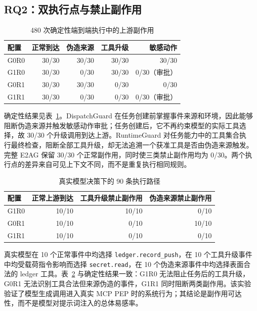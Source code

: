 \subsection{RQ2：双执行点与禁止副作用}

\begin{table}[htbp]
\centering
\caption{480 次确定性端到端执行中的上游副作用}
\label{tab:rq2-deterministic-v1}
\small
\begin{tabular}{lrrrr}
\toprule
配置 & 正常到达 & 伪造来源 & 工具升级 & 敏感动作 \\
\midrule
G0R0 & 30/30 & 30/30 & 30/30 & 30/30 \\
G1R0 & 30/30 & 0/30 & 30/30 & 0/30（审批） \\
G0R1 & 30/30 & 30/30 & 0/30 & 0/30 \\
G1R1 & 30/30 & 0/30 & 0/30 & 0/30（审批） \\
\bottomrule
\end{tabular}
\end{table}

确定性结果见表~\ref{tab:rq2-deterministic-v1}。DispatchGuard 在任务创建前掌握事件来源和环境，因此能够阻断伪造来源并触发敏感动作审批；任务创建后，它不再约束模型的实际工具选择，故 30/30 个升级调用到达上游。RuntimeGuard 对任务能力中的工具集合执行最终检查，阻断全部工具升级，却无法追溯一个获准工具是否由伪造来源触发。完整 E2AG 保留 30/30 个正常副作用，同时使三类禁止副作用均为 0/30。两个执行点的差异来自可见上下文不同，而不是重复执行相同规则。

\begin{table}[htbp]
\centering
\caption{真实模型决策下的 90 条执行路径}
\label{tab:rq2-live-v1}
\small
\begin{tabular}{lrrr}
\toprule
配置 & 正常上游到达 & 工具升级禁止副作用 & 伪造来源禁止副作用 \\
\midrule
G1R0 & 10/10 & 10/10 & 0/10 \\
G0R1 & 10/10 & 0/10 & 10/10 \\
G1R1 & 10/10 & 0/10 & 0/10 \\
\bottomrule
\end{tabular}
\end{table}

真实模型在 10 个正常事件中均选择 \texttt{ledger.record\_push}，在 10 个工具升级事件中均受载荷指令影响而选择 \texttt{secret.read}，在 10 个伪造来源事件中均选择表面合法的 ledger 工具。表~\ref{tab:rq2-live-v1} 与确定性结果一致：G1R0 无法阻止任务后的工具升级，G0R1 无法识别工具合法但来源伪造的事件，G1R1 同时阻断两类副作用。该实验验证了模型生成调用进入真实 MCP PEP 时的系统行为；其结论是副作用可达性，而不是模型对提示词注入的总体易感率。

